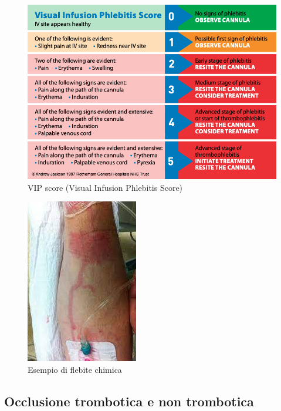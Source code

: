 \begin{figure}[H]
    \begin{center}
    \includegraphics[width=0.6\columnwidth]{img/VIPSCORE.png}
    \end{center}
    \caption[VIP score (Visual Infusion Phlebitis Score)]{VIP score (Visual Infusion Phlebitis Score)
    \cite{img52}}

\end{figure}

\begin{figure}[H]
    \begin{center}
    \includegraphics[width=0.3\columnwidth]{img/flebite.jpeg}
    \end{center}
    \caption[Esempio di flebite chimica]{Esempio di flebite chimica
    \cite{img53}}

\end{figure}

\subsection{Occlusione trombotica e non trombotica}

